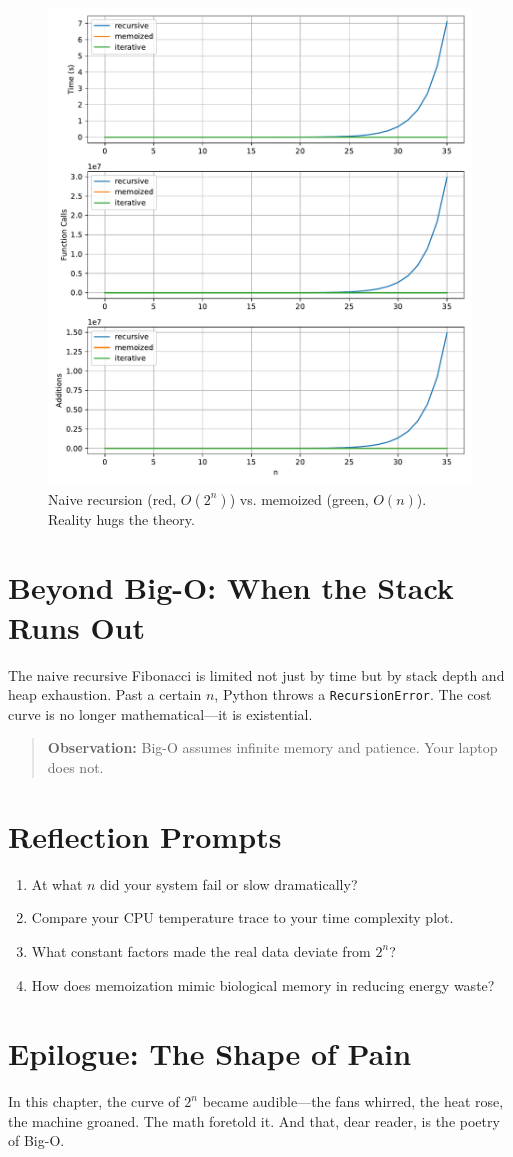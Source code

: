 \begin{figure}[htbp]
  \centering
  \includegraphics[width=.85\textwidth]{chapters/fib_bench_plot.pdf}
  \caption{Naive recursion (red, $O(2^n)$) vs. memoized (green, $O(n)$).
  Reality hugs the theory.}
  \label{fig:bigoreal}
\end{figure}

\section{Beyond Big-O: When the Stack Runs Out}

The naive recursive Fibonacci is limited not just by time but by
stack depth and heap exhaustion. Past a certain $n$, Python
throws a \texttt{RecursionError}. The cost curve is no longer
mathematical—it is existential.

\begin{quote}
\textbf{Observation:} Big-O assumes infinite memory and patience.
Your laptop does not.
\end{quote}

\section{Reflection Prompts}
\begin{enumerate}
  \item At what $n$ did your system fail or slow dramatically?
  \item Compare your CPU temperature trace to your time complexity plot.
  \item What constant factors made the real data deviate from $2^n$?
  \item How does memoization mimic biological memory in reducing energy waste?
\end{enumerate}

\section{Epilogue: The Shape of Pain}
In this chapter, the curve of $2^n$ became audible—the fans whirred,
the heat rose, the machine groaned. The math foretold it. And that,
dear reader, is the poetry of Big-O.

